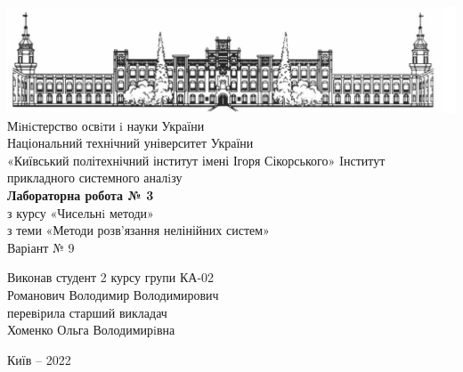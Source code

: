 \documentclass[14 pt]{extarticle}
\begin{document}
\begin{titlepage}
    \begin{center}
        
        \includegraphics[width=18cm]{image1.png}
        Мiнiстерство освiти i науки України \\
        Національний технічний університет України \\
        «Київський політехнічний інститут імені Ігоря Сікорського» Iнститут прикладного системного аналiзу \\

        \vspace{4.5cm}
        \textbf{Лабораторна робота № 3}\\
        з курсу «Чисельнi методи» \\
        з теми «Методи розв'язання нелінійних систем» \\
        Варіант № 9 \\
    \end{center}

    \vspace{2cm}

    \begin{flushright}
        Виконав студент 2 курсу групи КА-02 \\
        Романович Володимир Володимирович \\
        перевiрила старший викладач \\
        Хоменко Ольга Володимирiвна \\

    \end{flushright}

    \vfill
    \begin{center}
        Київ -- 2022
    \end{center}
\end{titlepage}
\end{document}
